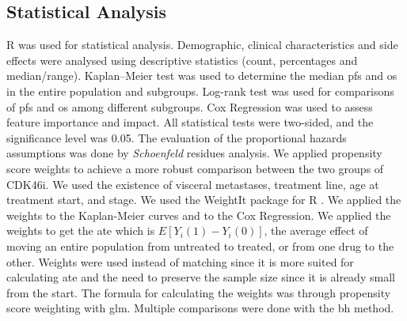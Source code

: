  
\begin{table}
\caption{Descriptive statistics of \ac{cdk46i} group and \ac{et} group. The Drug/combination refers to the actual drug or the combination for CDK4/6}
\centering
\label{tab:stats_ipop_cdk}

\end{table}




\subsection{Statistical Analysis}
R was used for statistical analysis. Demographic, clinical characteristics and side effects were analysed using descriptive statistics (count, percentages and median/range). Kaplan–Meier test was used to determine the median \ac{pfs} and \ac{os} in the entire population and subgroups. Log-rank test was used for comparisons of \ac{pfs} and \ac{os} among different subgroups. Cox Regression was used to assess feature importance and impact. All statistical tests were two-sided, and the significance level was 0.05. The evaluation of the proportional hazards assumptions was done by \textit{Schoenfeld} residues analysis.
We applied propensity score weights to achieve a more robust comparison between the two groups of CDK4\/6i. We used the existence of visceral metastases, treatment line, age at treatment start, and stage. We used the WeightIt package for R \cite{WeightIt}. We applied the weights to the Kaplan-Meier curves and to the Cox Regression. We applied the weights to get the \ac{ate} which is $E[Y_i(1)-Y_i(0)]$, the average effect of moving an entire population from untreated to treated, or from one drug to the other. Weights were used instead of matching since it is more suited for calculating \ac{ate} and the need to preserve the sample size since it is already small from the start. The formula for calculating the weights was through propensity score weighting with \ac{glm}. Multiple comparisons were done with the \ac{bh} method. 




